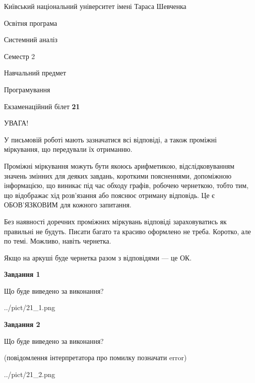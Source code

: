 \documentclass[12pt, ukrainian]{article}
\begin{document}
{{\begin {small}\par
{ \center  Київський національний університет імені Тараса Шевченка \par}
{\parbox {5 cm}{Освітня програма \hfill}{\parbox {7 cm}{Системний аналіз \hfill}}\parbox {6 cm}{\hfill Семестр 2}}\par
{\parbox {5 cm} {Навчальний предмет \hfill}\parbox {7 cm}{Програмування \hfill}\parbox {6cm}{\hfill}\par}\vspace{-7pt} \end{small}}{\center Екзаменаційний білет \No \textbf
{ 21 }\par}}
{
\begin {large}
УВАГА!

У письмовій роботі мають зазначатися всі відповіді, а також проміжні міркування, що передували їх отриманню.

Проміжні міркування можуть бути якоюсь арифметикою, відслідковуванням зна\-чень змінних для деяких завдань,
короткими поясненнями, допоміжною інформацією, що виникає під час обходу графів, робочею чернеткою,
тобто тим, що відображає хід розв’язання або пояснює отриману відповідь.
Це є ОБОВ’ЯЗКОВИМ для кожного запитання.

Без наявності доречних проміжних міркувань відповіді зараховуватись як правиль\-ні не будуть.
Писати багато та красиво оформлено не треба. Коротко, але по темі. Можли\-во, навіть чернетка.

Якщо на аркуші буде чернетка разом з відповідями --- це ОК.

\newpage

{\begin {center}\textbf{Завдання 1}\end {center}}\par
Що буде виведено за виконання?\par
\begin{center}
	{../pict/21_1.png}
\end{center}
\newpage

{\begin {center}\textbf{Завдання 2}\end {center}}\par
Що буде виведено за виконання?\par
 (повідомлення інтерпретатора про помилку позначати error)\par
\begin{center}
	{../pict/21_2.png}
\end{center}
\newpage


\end{large}}
\end{document}
